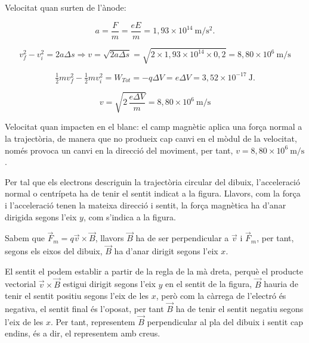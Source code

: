 \begin{solapartat}
Velocitat quan surten de l'ànode:


 \[ a = \frac{F}{m} = \frac{eE}{m} = 1,93\times 10^{14}\ \mathrm{m/s^2}. \]

 \[ v_f^2 - v_i^2 = 2a\Delta s \Rightarrow v = \sqrt{2a\Delta s} = \sqrt{2\times 1,93\times 10^{14}\times 0,2} = 8,80\times 10^{6}\ \mathrm{m/s} \]


 \[ \tfrac{1}{2} m v_f^2 - \tfrac{1}{2} m v_i^2 = W_{Tot} = -q\Delta V = e\Delta V = 3,52\times 10^{-17}\ \mathrm{J}. \]

 \[ v = \sqrt{2\,\frac{e\Delta V}{m}} = 8,80\times 10^{6}\ \mathrm{m/s} \]

 Velocitat quan impacten en el blanc: el camp magnètic aplica una força normal a la trajectòria, de manera que no produeix cap canvi en el mòdul de la velocitat, només provoca un canvi en la direcció del moviment, per tant, $v = 8,80\times 10^{6}\ \mathrm{m/s}$.

 Per tal que els electrons descriguin la trajectòria circular del dibuix, l'acceleració normal o centrípeta ha de tenir el sentit indicat a la figura. Llavors, com la força i l'acceleració tenen la mateixa direcció i sentit, la força magnètica ha d'anar dirigida segons l'eix $y$, com s'indica a la figura.


 Sabem que $\vec{F}_m = q\vec{v}\times\vec{B}$, llavors $\vec{B}$ ha de ser perpendicular a $\vec{v}$ i $\vec{F}_m$, per tant, segons els eixos del dibuix, $\vec{B}$ ha d'anar dirigit segons l'eix $x$.

 El sentit el podem establir a partir de la regla de la mà dreta, perquè el producte vectorial $\vec{v}\times\vec{B}$ estigui dirigit segons l'eix $y$ en el sentit de la figura, $\vec{B}$ hauria de tenir el sentit positiu segons l'eix de les $x$, però com la càrrega de l'electró és negativa, el sentit final és l'oposat, per tant $\vec{B}$ ha de tenir el sentit negatiu segons l'eix de les $x$. Per tant, representem $\vec{B}$ perpendicular al pla del dibuix i sentit cap endins, és a dir, el representem amb creus.
\end{solapartat}
